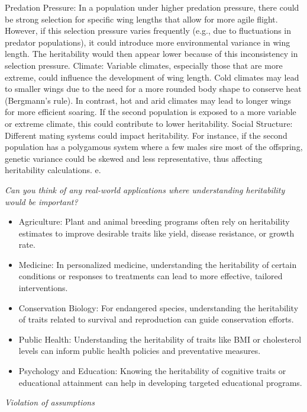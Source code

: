 \documentclass[
  a4paper]{book}
\providecommand{\tightlist}{%
  \setlength{\itemsep}{0pt}\setlength{\parskip}{0pt}}
\begin{document}
Predation Pressure: In a population under higher predation pressure, there could be strong selection for specific wing lengths that allow for more agile flight. However, if this selection pressure varies frequently (e.g., due to fluctuations in predator populations), it could introduce more environmental variance in wing length. The heritability would then appear lower because of this inconsistency in selection pressure.
Climate: Variable climates, especially those that are more extreme, could influence the development of wing length. Cold climates may lead to smaller wings due to the need for a more rounded body shape to conserve heat (Bergmann's rule). In contrast, hot and arid climates may lead to longer wings for more efficient soaring. If the second population is exposed to a more variable or extreme climate, this could contribute to lower heritability.
Social Structure: Different mating systems could impact heritability. For instance, if the second population has a polygamous system where a few males sire most of the offspring, genetic variance could be skewed and less representative, thus affecting heritability calculations.
e.

\emph{Can you think of any real-world applications where understanding heritability would be important?}

\begin{itemize}
\tightlist
\item
  Agriculture: Plant and animal breeding programs often rely on heritability estimates to improve desirable traits like yield, disease resistance, or growth rate.
\item
  Medicine: In personalized medicine, understanding the heritability of certain conditions or responses to treatments can lead to more effective, tailored interventions.
\item
  Conservation Biology: For endangered species, understanding the heritability of traits related to survival and reproduction can guide conservation efforts.
\item
  Public Health: Understanding the heritability of traits like BMI or cholesterol levels can inform public health policies and preventative measures.
\item
  Psychology and Education: Knowing the heritability of cognitive traits or educational attainment can help in developing targeted educational programs.
\end{itemize}

\emph{Violation of assumptions}
\end{document}
